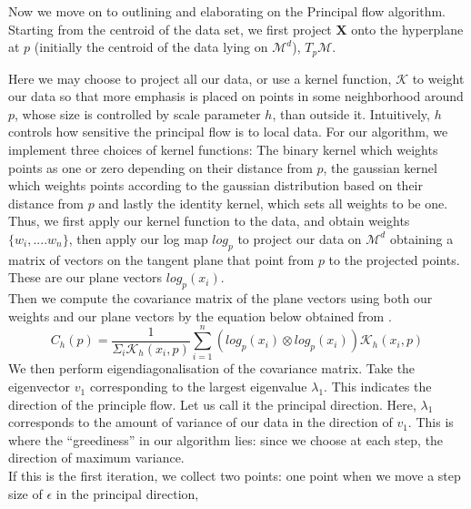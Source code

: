 \documentclass[12pt]{report}
\begin{document}
Now we move on to outlining and elaborating on the Principal flow algorithm.
Starting from the centroid of the data set, we first
project $\mathbf{X}$ onto the hyperplane
at $p$ (initially the centroid of the data lying on $\mathcal{M}^d$), $T_p\mathcal{M}$.

Here we may choose to project all our data, or use a kernel function, 
$\mathcal{K}$ to weight our data so that more emphasis is 
placed on points in some neighborhood around
$p$, whose size is controlled by scale parameter $h$, than outside it.
Intuitively, $h$ controls how sensitive the principal flow is to local data.
For our algorithm, we implement three choices of kernel functions: The binary kernel 
which weights points as one or zero depending on their distance from 
$p$, the gaussian kernel which weights points according to 
the gaussian distribution based on their distance from $p$ and
lastly the identity kernel, which sets all weights to be one.\\
Thus, we first apply our kernel function to the data, and obtain weights 
$\{w_i,....w_n\}$, then apply our log map $log_p$ to project our data on 
$\mathcal{M}^d$ obtaining a matrix of vectors on the tangent plane that point from $p$
to the projected points. These are our plane vectors $log_p(x_i)$.\\
Then we compute the covariance matrix of the plane vectors
using both our weights and our plane vectors
by the equation below obtained from \cite{principalflow}.
$$C_h(p) = \frac{1}{\Sigma_i \mathcal{K}_h(x_i,p)}\sum^n_{i=1}(log_p(x_i)\otimes log_p(x_i))\mathcal{K}_h(x_i,p)$$
We then perform eigendiagonalisation of the covariance matrix. 
Take the eigenvector $v_1$ corresponding to the largest eigenvalue $\lambda_1$. 
This indicates the direction of the principle flow. Let us call it
the principal direction. Here, $\lambda_1$ corresponds to the amount
of variance of our data in the direction of $v_1$.
This is where the ``greediness'' in 
our algorithm lies: since we choose at each step, the direction of maximum 
variance.\\
If this is the first iteration, we collect two points: 
one point when we move a step size of $\epsilon$ in the principal direction, 
\end{document}
